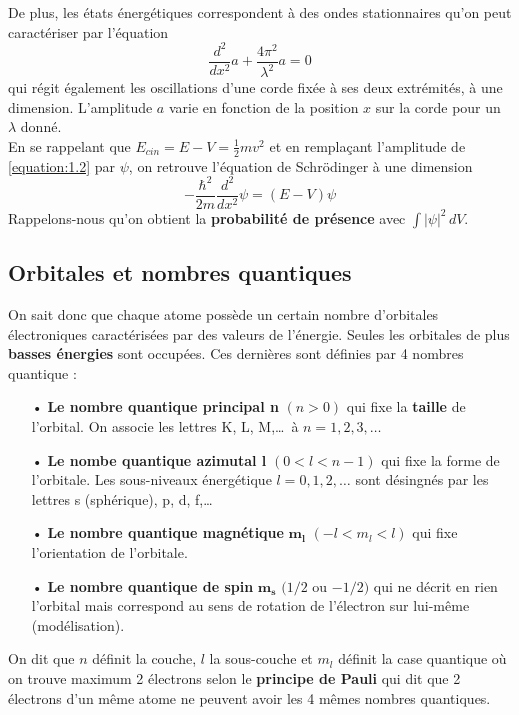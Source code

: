 \noindent De plus, les états énergétiques correspondent à des ondes stationnaires qu'on peut caractériser par l'équation 
\begin{equation}
	\frac{d^2}{dx^2}a + \frac{4\pi ^2}{\lambda ^2}a = 0
	\label{equation:1.2}
\end{equation}	 
qui régit également les oscillations d'une corde fixée à ses deux extrémités, à une dimension. L'amplitude $a$ varie en fonction de la position $x$ sur la corde pour un $\lambda$ donné. \\
En se rappelant que $E_{cin} = E-V = \frac{1}{2}mv^2$ et en remplaçant l'amplitude de \eqref{equation:1.2} par $\psi$, on retrouve l'équation de Schrödinger à une dimension 
\begin{equation}
	-\frac{\hbar ^2}{2m}\frac{d^2}{dx^2}\psi = (E-V)\psi
\end{equation}
Rappelons-nous qu'on obtient la \textbf{probabilité de présence} avec $\int |\psi| ^2 \, dV.$
	
\subsection{Orbitales et nombres quantiques}
\noindent On sait donc que chaque atome possède un certain nombre d'orbitales électroniques caractérisées par des valeurs de l'énergie. Seules les orbitales de plus \textbf{basses énergies} sont occupées. Ces dernières sont définies par 4 nombres quantique :\\
\begin{itemize}
	\item[•] \textbf{Le nombre quantique principal n} $(n>0)$ qui fixe la \textbf{taille} de l'orbital. On associe les lettres K, L, M,\dots \ à $n=1,2,3, \dots$
	\item[•] \textbf{Le nombe quantique azimutal l} $(0<l<n-1)$ qui fixe la forme de l'orbitale. Les sous-niveaux énergétique $l = 0,1,2, \dots$ sont désingnés par les lettres s (sphérique), p, d, f,\dots
	\item[•] \textbf{Le nombre quantique magnétique } $\mathbf{m_l}$ $(-l <m_l<l)$ qui fixe l'orientation de l'orbitale.
	\item[•] \textbf{Le nombre quantique de spin} $\mathbf{ m_s}$ $(1/2$ ou $-1/2)$ qui ne décrit en rien l'orbital mais correspond au sens de rotation de l'électron sur lui-même (modélisation). \\
\end{itemize}
On dit que $n$ définit la couche, $l$ la sous-couche et $m_l$ définit la case quantique où on trouve maximum 2 électrons selon le \textbf{principe de Pauli} qui dit que 2 électrons d'un même atome ne peuvent avoir les 4 mêmes nombres quantiques. 
	
